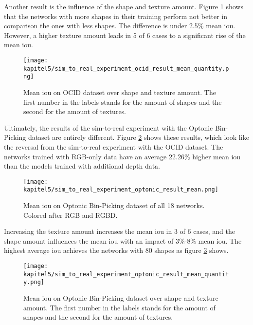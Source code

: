			Another result is the influence of the shape and texture amount. Figure \ref{img:str-ocid-qunatity} shows that the networks with more shapes in their training perform not better in comparison the ones with less shapes. The difference is under 2.5\% mean \ac{iou}. However, a higher texture amount leads in 5 of 6 cases to a significant rise of the mean \ac{iou}.
			
			\FloatBarrier
			\begin{figure}[h]
				\centering
				\texttt{[image: kapitel5/sim\_to\_real\_experiment\_ocid\_result\_mean\_quantity.png]}
				\caption[Mean \ac{iou} on OCID dataset over shape and texture amount. The first number in the labels stands for the amount of shapes and the second for the amount of textures.]{Mean \ac{iou} on OCID dataset over shape and texture amount. The first number in the labels stands for the amount of shapes and the second for the amount of textures.}
				\label{img:str-ocid-qunatity}
			\end{figure}
			\FloatBarrier
			
			Ultimately, the results of the sim-to-real experiment with the Optonic Bin-Picking dataset are entirely different. Figure \ref{img:str-optonic} shows these results, which look like the reversal from the sim-to-real experiment with the OCID dataset. The networks trained with RGB-only data have an average 22.26\% higher mean \ac{iou} than the models trained with additional depth data. 
			
			\FloatBarrier
			\begin{figure}[h]
				\centering
				\texttt{[image: kapitel5/sim\_to\_real\_experiment\_optonic\_result\_mean.png]}
				\caption[Mean \ac{iou} on Optonic Bin-Picking dataset of all 18 networks. Colored after RGB and RGBD.]{Mean \ac{iou} on Optonic Bin-Picking dataset of all 18 networks. Colored after RGB and RGBD.}
				\label{img:str-optonic}
			\end{figure}
			\FloatBarrier
			
			Increasing the texture amount increases the mean \ac{iou} in 3 of 6 cases, and the shape amount influences the mean \ac{iou} with an impact of 3\%-8\% mean \ac{iou}. The highest average \ac{iou} achieves the networks with 80 shapes as figure \ref{img:str-optonic-qunatity} shows.
			
			\FloatBarrier
			\begin{figure}[h]
				\centering
				\texttt{[image: kapitel5/sim\_to\_real\_experiment\_optonic\_result\_mean\_quantity.png]}
				\caption[Mean \ac{iou} on Optonic Bin-Picking dataset over shape and texture amount. The first number in the labels stands for the amount of shapes and the second for the amount of textures.]{Mean \ac{iou} on Optonic Bin-Picking dataset over shape and texture amount. The first number in the labels stands for the amount of shapes and the second for the amount of textures.}
				\label{img:str-optonic-qunatity}
			\end{figure}
			\FloatBarrier



